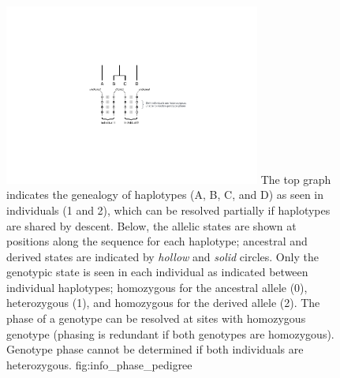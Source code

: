

\begin{figure}[!htb]
\centering
\includegraphics[width=0.75\textwidth]{./img/ch3/info_phase_pedigree}
{The top graph indicates the genealogy of  haplotypes (A, B, C, and D) as seen in  individuals (1 and 2), which can be resolved partially if  haplotypes are shared by descent.
Below, the allelic states are shown at  positions along the sequence for each haplotype; ancestral and derived states are indicated by \emph{hollow} and \emph{solid} circles.
Only the genotypic state is seen in each individual as indicated between individual haplotypes; \ie homozygous for the ancestral allele (0), heterozygous (1), and homozygous for the derived allele (2).
The phase of a genotype can be resolved at sites with  homozygous genotype (phasing is redundant if both genotypes are homozygous).
Genotype phase cannot be determined if both individuals are heterozygous.}
{fig:info_phase_pedigree}
\end{figure}
